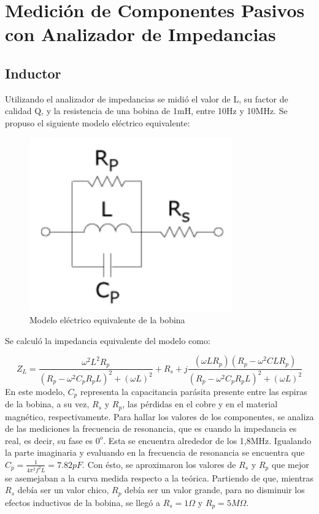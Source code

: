 



\onehalfspacing



\section{Medición de Componentes Pasivos con Analizador de Impedancias}
\subsection{Inductor}
Utilizando el analizador de impedancias se midió el valor de L, su factor de calidad Q, y la resistencia de una bobina de 1mH, entre 10Hz y 10MHz.
Se propuso el siguiente modelo eléctrico equivalente:

\begin{figure}[h!]
\centering
\includegraphics[scale=0.5]{modeloL.png}
\caption{Modelo eléctrico equivalente de la bobina}
\label{fig:modeloL}
\end{figure}

Se calculó la impedancia equivalente del modelo como:

\begin{equation}
Z_L=\frac{\omega^2L^2R_p}{(R_p-\omega^2C_pR_pL)^2+(\omega L)^2}+R_s+j\frac{(\omega LR_p)(R_p-\omega^2 CLR_p)}{(R_p-\omega^2C_pR_pL)^2+(\omega L)^2}
\end{equation}
En este modelo, $C_p$  representa la capacitancia parásita presente entre las espiras de la bobina, a su vez, $R_s$ y $R_p$, las pérdidas en el cobre y en el material magnético, respectivamente.
Para hallar los valores de los componentes, se analiza de las mediciones la frecuencia de resonancia, que es cuando la impedancia es real, es decir, su fase es $0^o$. Esta se encuentra alrededor de los 1,8MHz.
Igualando la parte imaginaria y evaluando en la frecuencia de resonancia se encuentra que $C_p=\frac{1}{4\pi^2f^2L}=7.82pF$. Con ésto, se aproximaron los valores de $R_s$ y $R_p$ que mejor se asemejaban a la curva medida respecto a la teórica. Partiendo de que, mientras $R_s$ debía ser un valor chico, $R_p$ debía ser un valor grande, para no disminuir los efectos inductivos de la bobina, se llegó a $R_s=1\Omega$ y $R_p=5M\Omega$.

